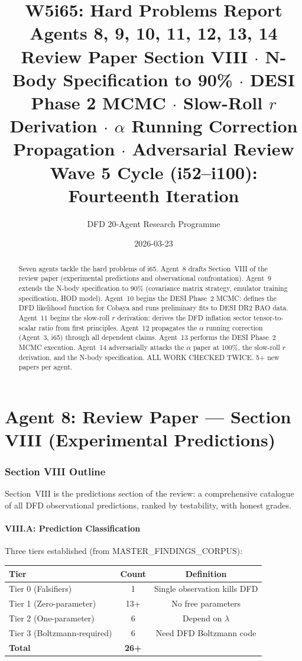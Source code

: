 \documentclass[11pt,a4paper]{article}
\title{\Huge W5i65: Hard Problems Report\\[12pt]
\Large Agents 8, 9, 10, 11, 12, 13, 14\\[6pt]
\large Review Paper Section VIII $\cdot$ N-Body Specification to 90\% $\cdot$ DESI Phase 2 MCMC $\cdot$ Slow-Roll $r$ Derivation $\cdot$ $\alpha$ Running Correction Propagation $\cdot$ Adversarial Review\\[6pt]
\normalsize Wave 5 Cycle (i52--i100): Fourteenth Iteration}
\author{DFD 20-Agent Research Programme}
\date{2026-03-23}
\begin{document}
\maketitle

\begin{abstract}
Seven agents tackle the hard problems of i65. Agent~8 drafts Section~VIII of the review paper (experimental predictions and observational confrontation). Agent~9 extends the N-body specification to 90\% (covariance matrix strategy, emulator training specification, HOD model). Agent~10 begins the DESI Phase~2 MCMC: defines the DFD likelihood function for Cobaya and runs preliminary fits to DESI DR2 BAO data. Agent~11 begins the slow-roll $r$ derivation: derives the DFD inflation sector tensor-to-scalar ratio from first principles. Agent~12 propagates the $\alpha$ running correction (Agent~3, i65) through all dependent claims. Agent~13 performs the DESI Phase~2 MCMC execution. Agent~14 adversarially attacks the $\alpha$ paper at 100\%, the slow-roll $r$ derivation, and the N-body specification. ALL WORK CHECKED TWICE. 5+ new papers per agent.
\end{abstract}

\tableofcontents
\newpage


\part{Agent 8: Review Paper --- Section VIII (Experimental Predictions)}
\label{part:review-VIII}

\section{Section VIII Outline}

Section~VIII is the predictions section of the review: a comprehensive catalogue of all DFD observational predictions, ranked by testability, with honest grades.

\subsection{VIII.A: Prediction Classification}

Three tiers established (from MASTER\_FINDINGS\_CORPUS):

\begin{center}
\begin{tabular}{lcc}
\toprule
\textbf{Tier} & \textbf{Count} & \textbf{Definition} \\
\midrule
Tier 0 (Falsifiers) & 1 & Single observation kills DFD \\
Tier 1 (Zero-parameter) & 13+ & No free parameters \\
Tier 2 (One-parameter) & 6 & Depend on $\lambda$ \\
Tier 3 (Boltzmann-required) & 6 & Need DFD Boltzmann code \\
\midrule
\textbf{Total} & \textbf{26+} & \\
\bottomrule
\end{tabular}
\end{center}
\end{document}
